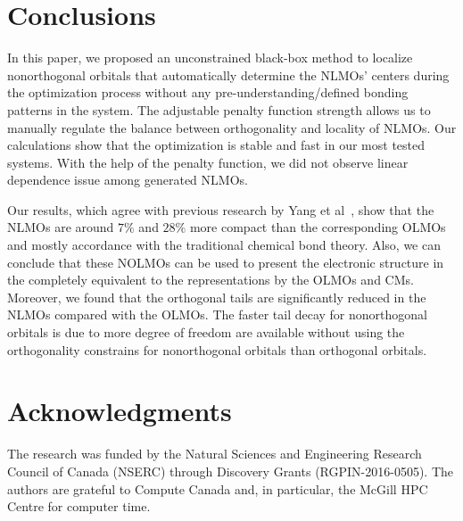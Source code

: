 \documentclass[aps,prl,reprint,amsmath,amssymb]{revtex4-1}
\begin{document}

\section{Conclusions}
In this paper, we proposed an unconstrained black-box method to localize nonorthogonal orbitals that automatically determine the NLMOs' centers during the optimization process without any pre-understanding/defined bonding patterns in the system. 
The adjustable penalty function strength allows us to manually regulate the balance between orthogonality and locality of NLMOs.
Our calculations show that the optimization is stable and fast in our most tested systems.
With the help of the penalty function, we did not observe linear dependence issue among generated NLMOs.

Our results, which agree with previous research by Yang et al~\cite{feng2004An_efficient, cui2010efficient}, show that the NLMOs are around $7\%$ and $28\%$ more compact than the corresponding OLMOs and mostly accordance with the traditional chemical bond theory.
Also, we  can conclude that these NOLMOs can be used to present the electronic structure in the completely equivalent to the representations by the OLMOs and CMs.
Moreover, we found that the orthogonal tails are significantly reduced in the NLMOs compared with the OLMOs.
The faster tail decay for nonorthogonal orbitals is due to more degree of freedom are available without using the orthogonality constrains for nonorthogonal orbitals than orthogonal orbitals.

\section{Acknowledgments} 

The research was funded by the Natural Sciences and Engineering Research Council of Canada (NSERC) through Discovery
Grants (RGPIN-2016-0505). The authors are grateful to Compute Canada and, in particular, the McGill HPC Centre for computer time.



\end{document}
